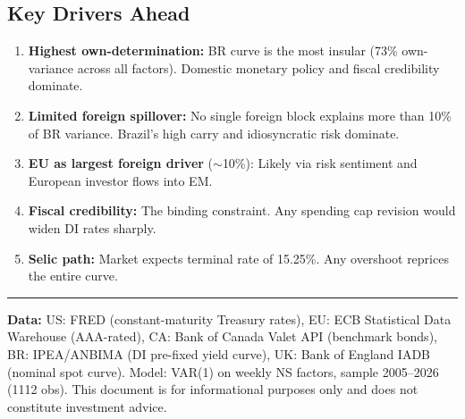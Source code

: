 \documentclass[11pt,a4paper]{article}
\begin{document}
\subsection*{Key Drivers Ahead}
\begin{enumerate}[nosep, leftmargin=1.4em]
    \item \textbf{Highest own-determination:} BR curve is the most insular (73\% own-variance across all factors). Domestic monetary policy and fiscal credibility dominate.
    \item \textbf{Limited foreign spillover:} No single foreign block explains more than 10\% of BR variance. Brazil's high carry and idiosyncratic risk dominate.
    \item \textbf{EU as largest foreign driver} ($\sim$10\%): Likely via risk sentiment and European investor flows into EM.
    \item \textbf{Fiscal credibility:} The binding constraint. Any spending cap revision would widen DI rates sharply.
    \item \textbf{Selic path:} Market expects terminal rate of 15.25\%. Any overshoot reprices the entire curve.
\end{enumerate}


\vspace{0.3cm}
\noindent\rule{\textwidth}{0.4pt}
{\footnotesize\color{biggrey} \textbf{Data:} US: FRED (constant-maturity Treasury rates), EU: ECB Statistical Data Warehouse (AAA-rated), CA: Bank of Canada Valet API (benchmark bonds), BR: IPEA/ANBIMA (DI pre-fixed yield curve), UK: Bank of England IADB (nominal spot curve). Model: VAR(1) on weekly NS factors, sample 2005--2026 (1112 obs). This document is for informational purposes only and does not constitute investment advice.}
\end{document}
